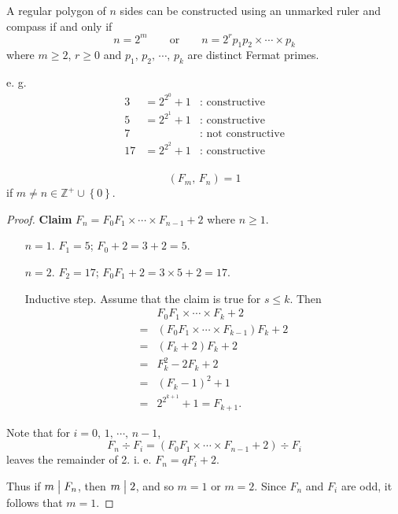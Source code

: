 \begin{theorem}
    A regular polygon of $n$ sides can be constructed using an unmarked ruler
    and compass if and only if
    \[
        n=2^m \qquad\mbox{or}\qquad n=2^rp_1p_2\times\cdots\times p_k
    \]
    where $m \geq 2$, $r \geq 0$ and $p_1,\,p_2,\,\cdots,\,p_k$ are
    distinct Fermat primes.
\end{theorem}

e. g.
\begin{align*}
    3 &= 2^{2^0} + 1 & \mbox{: constructive} \\
    5 &= 2^{2^1} + 1 & \mbox{: constructive} \\
    7 & & \mbox{: not constructive} \\
    17 &= 2^{2^2} + 1 & \mbox{: constructive} \\
\end{align*}

\begin{theorem}
    \[
        \left(F_m,\,F_n\right)=1    
    \]
    if $m \neq n \in \mathbb{Z}^+ \cup \left\{0\right\}$.
\end{theorem}

\begin{proof}
    \textbf{Claim} $F_n = F_0F_1 \times \cdots \times F_{n-1} + 2$ where $n\geq 1$.

    \begin{itemize}
        \item[$n=1.$] $F_1=5$; $F_0+2=3+2=5.$ 
        \item[$n=2.$] $F_2=17$; $F_0F_1+2=3\times 5+2=17.$
        \item[Inductive step.] Assume that the claim is true for $s \leq k$. Then
        \begin{align*}
            & F_0F_1 \times \cdots \times F_k + 2 \\
            =& \left(F_0F_1 \times \cdots \times F_{k-1}\right)F_k + 2 \\
            =& \left(F_k + 2\right)F_k + 2 \\
            =& F_k^2 - 2F_k + 2 \\
            =& \left(F_k-1\right)^2+1 \\
            =& 2^{2^{k+1}}+1=F_{k+1}.
        \end{align*}   
    \end{itemize}

    Note that for $i=0,\,1,\,\cdots,\,n-1$,
    \[
        {F_n} \div {F_i}=\left(F_0F_1\times\cdots\times F_{n-1}+2\right) \div {F_i}
    \]
    leaves the remainder of 2. i. e. $F_n=qF_i+2$.

    Thus if $m\bigm| F_n$, then $m\bigm| 2$, and so $m=1$ or $m=2$.
    Since $F_n$ and $F_i$ are odd, it follows that $m=1$.
\end{proof}

